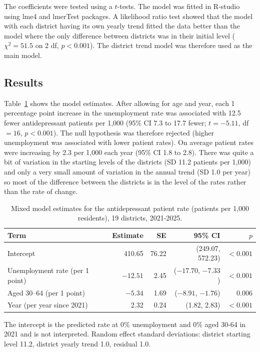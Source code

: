 \documentclass[11pt,a4paper]{article}
\begin{document}
The coefficients were tested using a $t$-tests. The model was fitted in R-studio using lme4 and lmerTest packages. A likelihood ratio test showed that the model with each district having its own yearly trend fitted the data better than the model where the only difference between districts was in their initial level ($\chi^2 = 51.5$ on 2 df, $p<0.001$). The district trend model was therefore used as the main model.

\subsection{Results}
Table~\ref{tab:model} shows the model estimates. After allowing for age and year, each 1 percentage point increase in the unemployment rate was associated with 12.5 fewer antidepressant patients per 1,000 (95\%  CI 7.3 to 17.7 fewer; $t=-5.11$, df $=16$, $p<0.001$). The null hypothesis was therefore rejected (higher unemployment was associated with lower patient rates). On average patient rates were increasing by 2.3 per 1,000 each year (95\%  CI 1.8 to 2.8). There was quite a bit of variation in the starting levels of the districts (SD 11.2 patients per 1,000) and only a very small amount of variation in the annual trend (SD 1.0 per year) so most of the difference between the districts is in the level of the rates rather than the rate of change.

\begin{table}[H]
\centering
\caption{Mixed model estimates for the antidepressant patient rate (patients per 1,000 residents), 19 districts, 2021-2025.}
\label{tab:model}
\begin{tabular}{lrrrr}
\toprule
\textbf{Term} & \textbf{Estimate} & \textbf{SE} & \textbf{95\% CI} & \textbf{$p$} \\
\midrule
Intercept                       & 410.65   & 76.22 & (249.07, 572.23)    & $<0.001$ \\
Unemployment rate (per 1 point) & $-12.51$ & 2.45  & ($-17.70$, $-7.33$) & $<0.001$ \\
Aged 30--64 (per 1 point)       & $-5.34$  & 1.69  & ($-8.91$, $-1.76$)  & 0.006    \\
Year (per year since 2021)      & 2.32     & 0.24  & (1.82, 2.83)        & $<0.001$ \\
\bottomrule
\end{tabular}

\vspace{0.4em}
{\footnotesize The intercept is the predicted rate at 0\% unemployment and 0\% aged 30-64 in 2021 and is not interpreted. Random effect standard deviations: district starting level 11.2, district yearly trend 1.0, residual 1.0.}
\end{table}
\end{document}
